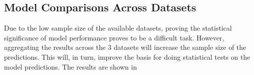 
\subsection{Model Comparisons Across Datasets}
Due to the low sample size of the available datasets,
proving the statistical significance of model performance proves to be a difficult task.
However, aggregating the results across the 3 datasets will increase the sample size of the predictions.
This will, in turn, improve the basis for doing statistical tests on the model predictions.
The results are shown in 


